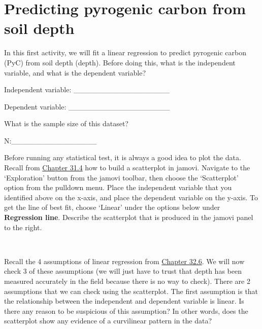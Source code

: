 \documentclass[
  openany]{krantz}
\begin{document}
\hypertarget{predicting-pyrogenic-carbon-from-soil-depth}{%
\section{Predicting pyrogenic carbon from soil depth}\label{predicting-pyrogenic-carbon-from-soil-depth}}

In this first activity, we will fit a linear regression to predict pyrogenic carbon (PyC) from soil depth (depth).
Before doing this, what is the independent variable, and what is the dependent variable?

Independent variable: \_\_\_\_\_\_\_\_\_\_\_\_\_\_\_\_\_\_

Dependent variable: \_\_\_\_\_\_\_\_\_\_\_\_\_\_\_\_\_\_\_

What is the sample size of this dataset?

N:\_\_\_\_\_\_\_\_\_\_\_\_\_\_\_\_

Before running any statistical test, it is always a good idea to plot the data.
Recall from \protect\hyperlink{pearson-product-moment-correlation-test}{Chapter 31.4} how to build a scatterplot in jamovi.
Navigate to the `Exploration' button from the jamovi toolbar, then choose the `Scatterplot' option from the pulldown menu.
Place the independent variable that you identified above on the x-axis, and place the dependent variable on the y-axis.
To get the line of best fit, choose `Linear' under the options below under \textbf{Regression line}.
Describe the scatterplot that is produced in the jamovi panel to the right.

\begin{verbatim}


\end{verbatim}

Recall the 4 assumptions of linear regression from \protect\hyperlink{regression-assumptions}{Chapter 32.6}.
We will now check 3 of these assumptions (we will just have to trust that depth has been measured accurately in the field because there is no way to check).
There are 2 assumptions that we can check using the scatterplot.
The first assumption is that the relationship between the independent and dependent variable is linear.
Is there any reason to be suspicious of this assumption?
In other words, does the scatterplot show any evidence of a curvilinear pattern in the data?

\begin{verbatim}

\end{verbatim}
\end{document}
